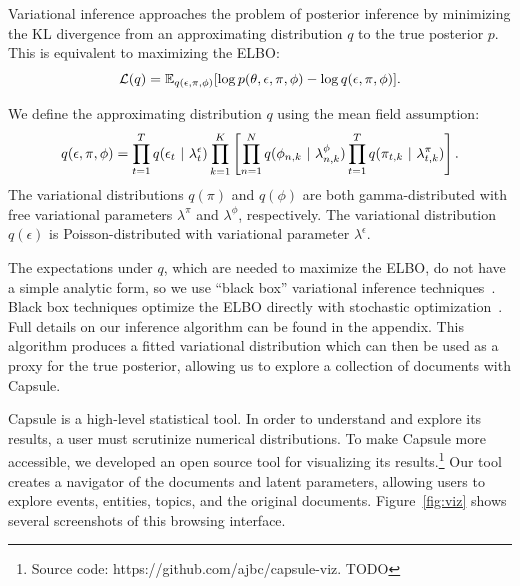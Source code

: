 Variational inference approaches the problem of posterior inference by minimizing the KL divergence from an approximating distribution $q$ to the true posterior $p$.
This is equivalent to maximizing the ELBO: 
\begin{equation}
\mathcal{L}(q)  = \mathbb{E}_{q(\epsilon, \pi, \phi)}[\log p(\theta,\epsilon,\pi,\phi) - \log q(\epsilon, \pi, \phi)].
\label{eq:elbo}
\end{equation}

We define the approximating distribution $q$ using the mean field assumption:
\begin{equation}
q(\epsilon, \pi, \phi) = \prod_{t=1}^T q(\epsilon_{t} ~\vert~ \lambda^\epsilon_t)\prod_{k=1}^K\left[\prod_{n=1}^N q(\phi_{n,k} ~\vert~ \lambda^\phi_{n,k})\prod_{t=1}^T q(\pi_{t,k} ~\vert~ \lambda^\pi_{t,k})\right].
\label{eq:q}
\end{equation}
The variational distributions $q(\pi)$ and $q(\phi)$ are both gamma-distributed with free variational parameters $\lambda^\pi$ and $\lambda^\phi$, respectively. The variational distribution $q(\epsilon)$ is Poisson-distributed with variational parameter $\lambda^\epsilon$.

The expectations under $q$, which are needed to maximize the ELBO, do not have a simple analytic form, so we use ``black box'' variational inference techniques~\cite{Ranganath:2014}.  Black box techniques optimize the ELBO directly with stochastic optimization~\cite{Robbins:1951}.  Full details on our inference algorithm can be found in the appendix.  This algorithm produces a fitted variational distribution which can then be used as a proxy for the true posterior, allowing us to explore a collection of documents with Capsule.  

Capsule is a high-level statistical tool. In order to understand and explore its results, a user must scrutinize numerical distributions.
To make Capsule more accessible, we developed an open source tool for visualizing its results.\footnote{Source code: https://github.com/ajbc/capsule-viz. TODO}  Our tool creates a navigator of the documents and latent parameters, allowing users to explore events, entities, topics, and the original documents.  Figure~\ref{fig:viz} shows several screenshots of this browsing interface.

